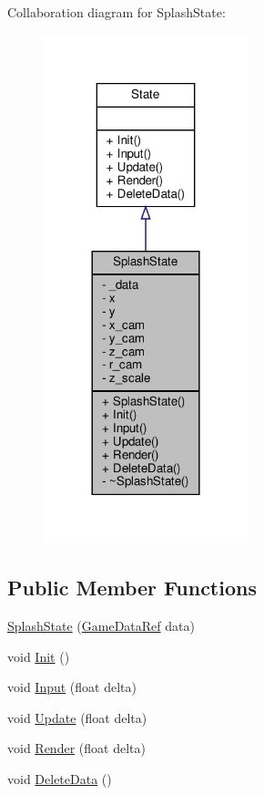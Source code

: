 Collaboration diagram for Splash\+State\+:
\nopagebreak
\begin{figure}[H]
\begin{center}
\leavevmode
\includegraphics[width=168pt]{classSplashState__coll__graph}
\end{center}
\end{figure}
\subsection*{Public Member Functions}
\begin{DoxyCompactItemize}
\item 
\hyperlink{classSplashState_a4894c4858ae1db288cf9d4f8b03fd2d4}{Splash\+State} (\hyperlink{game_8h_a513c9dd465a0df41dbb4daf40cc717c2}{Game\+Data\+Ref} data)
\item 
void \hyperlink{classSplashState_ae3e0604da087032c179593c237580988}{Init} ()
\item 
void \hyperlink{classSplashState_adb2eb87bd89e41af0c3a9d0903e89450}{Input} (float delta)
\item 
void \hyperlink{classSplashState_af19b293ae1e914e13db4382115e56d2c}{Update} (float delta)
\item 
void \hyperlink{classSplashState_a5efb6f0ede61ec76ee2dd72a6b24c57c}{Render} (float delta)
\item 
void \hyperlink{classSplashState_aca842c8e3ea2642980569ed3b4bb362a}{Delete\+Data} ()
\end{DoxyCompactItemize}

